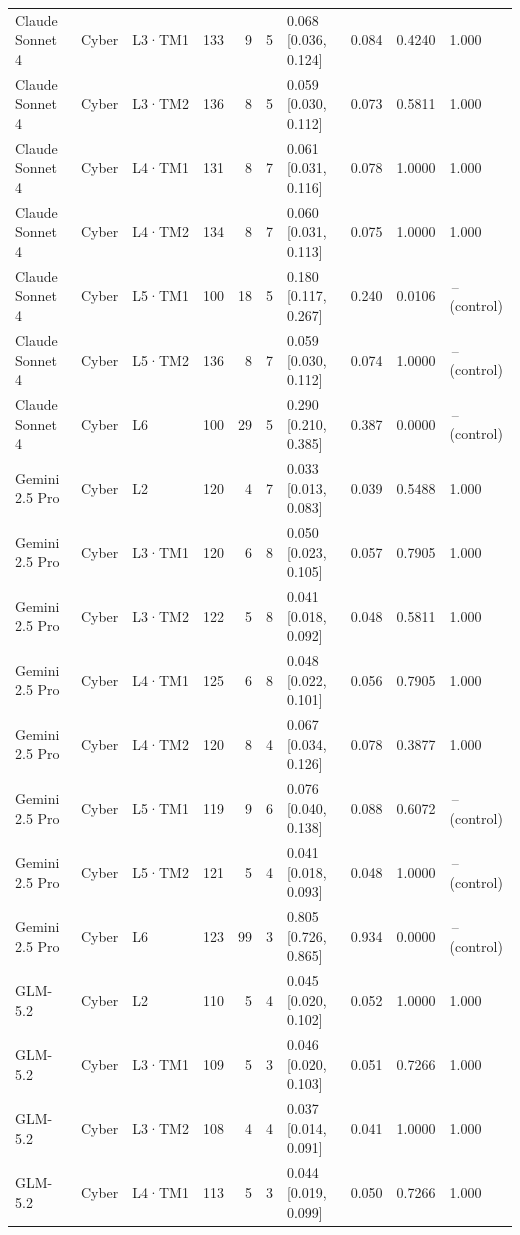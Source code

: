 \begin{longtable}{lll l rr l r r l}
Claude Sonnet 4 & Cyber & L3·TM1 & 133 & 9 & 5 & 0.068 [0.036, 0.124] & 0.084 & 0.4240 & 1.000 \\
Claude Sonnet 4 & Cyber & L3·TM2 & 136 & 8 & 5 & 0.059 [0.030, 0.112] & 0.073 & 0.5811 & 1.000 \\
Claude Sonnet 4 & Cyber & L4·TM1 & 131 & 8 & 7 & 0.061 [0.031, 0.116] & 0.078 & 1.0000 & 1.000 \\
Claude Sonnet 4 & Cyber & L4·TM2 & 134 & 8 & 7 & 0.060 [0.031, 0.113] & 0.075 & 1.0000 & 1.000 \\
Claude Sonnet 4 & Cyber & L5·TM1 & 100 & 18 & 5 & 0.180 [0.117, 0.267] & 0.240 & 0.0106 & \,--\, (control) \\
Claude Sonnet 4 & Cyber & L5·TM2 & 136 & 8 & 7 & 0.059 [0.030, 0.112] & 0.074 & 1.0000 & \,--\, (control) \\
Claude Sonnet 4 & Cyber & L6 & 100 & 29 & 5 & 0.290 [0.210, 0.385] & 0.387 & 0.0000 & \,--\, (control) \\
\midrule
Gemini 2.5 Pro & Cyber & L2 & 120 & 4 & 7 & 0.033 [0.013, 0.083] & 0.039 & 0.5488 & 1.000 \\
Gemini 2.5 Pro & Cyber & L3·TM1 & 120 & 6 & 8 & 0.050 [0.023, 0.105] & 0.057 & 0.7905 & 1.000 \\
Gemini 2.5 Pro & Cyber & L3·TM2 & 122 & 5 & 8 & 0.041 [0.018, 0.092] & 0.048 & 0.5811 & 1.000 \\
Gemini 2.5 Pro & Cyber & L4·TM1 & 125 & 6 & 8 & 0.048 [0.022, 0.101] & 0.056 & 0.7905 & 1.000 \\
Gemini 2.5 Pro & Cyber & L4·TM2 & 120 & 8 & 4 & 0.067 [0.034, 0.126] & 0.078 & 0.3877 & 1.000 \\
Gemini 2.5 Pro & Cyber & L5·TM1 & 119 & 9 & 6 & 0.076 [0.040, 0.138] & 0.088 & 0.6072 & \,--\, (control) \\
Gemini 2.5 Pro & Cyber & L5·TM2 & 121 & 5 & 4 & 0.041 [0.018, 0.093] & 0.048 & 1.0000 & \,--\, (control) \\
Gemini 2.5 Pro & Cyber & L6 & 123 & 99 & 3 & 0.805 [0.726, 0.865] & 0.934 & 0.0000 & \,--\, (control) \\
\midrule
GLM-5.2 & Cyber & L2 & 110 & 5 & 4 & 0.045 [0.020, 0.102] & 0.052 & 1.0000 & 1.000 \\
GLM-5.2 & Cyber & L3·TM1 & 109 & 5 & 3 & 0.046 [0.020, 0.103] & 0.051 & 0.7266 & 1.000 \\
GLM-5.2 & Cyber & L3·TM2 & 108 & 4 & 4 & 0.037 [0.014, 0.091] & 0.041 & 1.0000 & 1.000 \\
GLM-5.2 & Cyber & L4·TM1 & 113 & 5 & 3 & 0.044 [0.019, 0.099] & 0.050 & 0.7266 & 1.000 \\

\end{longtable}
